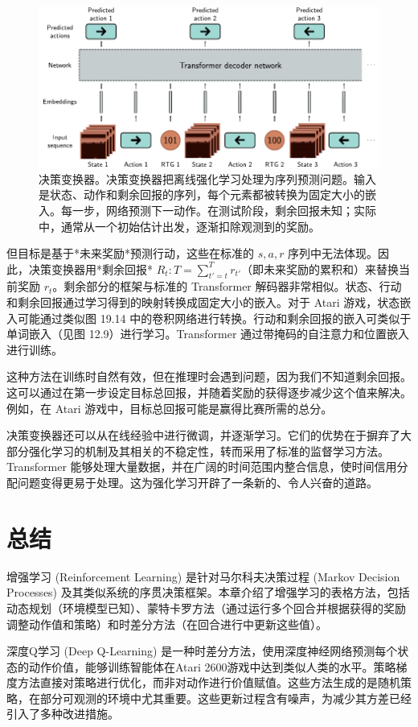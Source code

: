 \documentclass[lang=cn,newtx,10pt,scheme=chinese]{elegantbook}
\begin{document}
\begin{figure}[ht!]
\centering
\includegraphics[width=0.7\linewidth]{PDFFigures/UDLChap19PDF/ReinforceDecisionTransformer.pdf}
\caption{决策变换器。决策变换器把离线强化学习处理为序列预测问题。输入是状态、动作和剩余回报的序列，每个元素都被转换为固定大小的嵌入。每一步，网络预测下一动作。在测试阶段，剩余回报未知；实际中，通常从一个初始估计出发，逐渐扣除观测到的奖励。}
\end{figure}

但目标是基于*未来奖励*预测行动，这些在标准的 \(s, a, r\) 序列中无法体现。因此，决策变换器用*剩余回报* \(R_t:T = \sum_{t'=t}^T r_{t'}\)（即未来奖励的累积和）来替换当前奖励 \(r_t\)。剩余部分的框架与标准的 Transformer 解码器非常相似。状态、行动和剩余回报通过学习得到的映射转换成固定大小的嵌入。对于 Atari 游戏，状态嵌入可能通过类似图 19.14 中的卷积网络进行转换。行动和剩余回报的嵌入可类似于单词嵌入（见图 12.9）进行学习。Transformer 通过带掩码的自注意力和位置嵌入进行训练。

这种方法在训练时自然有效，但在推理时会遇到问题，因为我们不知道剩余回报。这可以通过在第一步设定目标总回报，并随着奖励的获得逐步减少这个值来解决。例如，在 Atari 游戏中，目标总回报可能是赢得比赛所需的总分。

决策变换器还可以从在线经验中进行微调，并逐渐学习。它们的优势在于摒弃了大部分强化学习的机制及其相关的不稳定性，转而采用了标准的监督学习方法。Transformer 能够处理大量数据，并在广阔的时间范围内整合信息，使时间信用分配问题变得更易于处理。这为强化学习开辟了一条新的、令人兴奋的道路。

\section{总结}
增强学习 (Reinforcement Learning) 是针对马尔科夫决策过程 (Markov Decision Processes) 及其类似系统的序贯决策框架。本章介绍了增强学习的表格方法，包括动态规划（环境模型已知）、蒙特卡罗方法（通过运行多个回合并根据获得的奖励调整动作值和策略）和时差分方法（在回合进行中更新这些值）。

深度Q学习 (Deep Q-Learning) 是一种时差分方法，使用深度神经网络预测每个状态的动作价值，能够训练智能体在Atari 2600游戏中达到类似人类的水平。策略梯度方法直接对策略进行优化，而非对动作进行价值赋值。这些方法生成的是随机策略，在部分可观测的环境中尤其重要。这些更新过程含有噪声，为减少其方差已经引入了多种改进措施。
\end{document}
